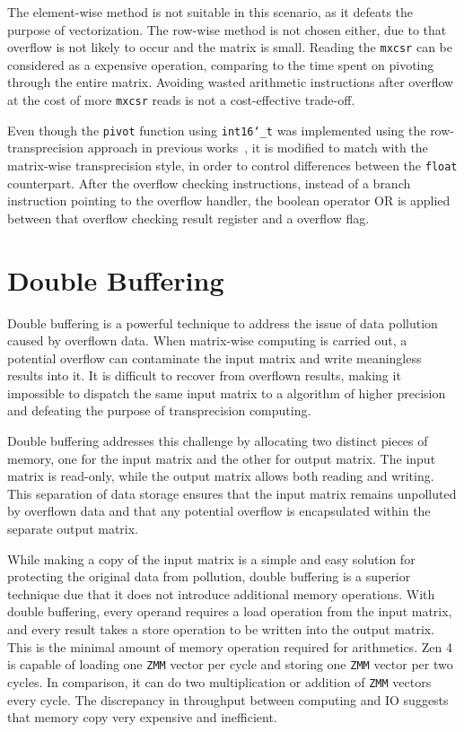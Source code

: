 \documentclass[logo,bsc,singlespacing,parskip]{infthesis}
\newcommand{\dtshort}{\texttt{int16\char`_t}}
\newcommand{\dtfloat}{\texttt{float}}
\newcommand{\mxcsr}{\texttt{mxcsr}}
\newcommand{\pivot}{\texttt{pivot}}
\newcommand{\zmm}{\texttt{ZMM}}
\begin{document}
The element-wise method is not suitable in this scenario, as it defeats the
purpose of vectorization. The row-wise method is not chosen either, due to that
overflow is not likely to occur and the matrix is small. Reading the \mxcsr{}
can be considered as a expensive operation, comparing to the time spent on
pivoting through the entire matrix. Avoiding wasted arithmetic instructions
after overflow at the cost of more \mxcsr{} reads is not a cost-effective
trade-off.

Even though the \pivot{} function using \dtshort{} was implemented using the
row-transprecision approach in previous works~\cite{FPL2}, it is modified to
match with the matrix-wise transprecision style, in order to control differences
between the \dtfloat{} counterpart. After the overflow checking instructions,
instead of a branch instruction pointing to the overflow handler, the boolean
operator OR is applied between that overflow checking result register and a
overflow flag. 


\section{Double Buffering}

Double buffering is a powerful technique to address the issue of data pollution
caused by overflown data. When matrix-wise computing is carried out, a potential
overflow can contaminate the input matrix and write meaningless results into it.
It is difficult to recover from overflown results, making it impossible to
dispatch the same input matrix to a algorithm of higher precision and defeating
the purpose of transprecision computing.

Double buffering addresses this challenge by allocating two distinct pieces of
memory, one for the input matrix and the other for output matrix. The input
matrix is read-only, while the output matrix allows both reading and writing.
This separation of data storage ensures that the input matrix remains unpolluted
by overflown data and that any potential overflow is encapsulated within the
separate output matrix. 

While making a copy of the input matrix is a simple and easy solution for
protecting the original data from pollution, double buffering is a superior
technique due that it does not introduce additional memory operations. With
double buffering, every operand requires a load operation from the input matrix,
and every result takes a store operation to be written into the output matrix.
This is the minimal amount of memory operation required for arithmetics. Zen 4 is
capable of loading one \zmm{} vector per cycle and storing one \zmm{} vector per two
cycles. In comparison, it can do two multiplication or addition of \zmm{}
vectors every cycle. The discrepancy in throughput between computing and IO
suggests that memory copy very expensive and inefficient. 
\end{document}
